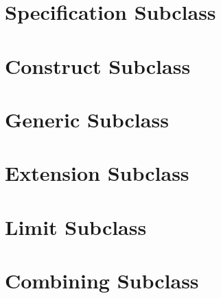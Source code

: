 \section{Specification Subclass}



\section{Construct Subclass}



\section{Generic Subclass}



\section{Extension Subclass}



\section{Limit Subclass}



\section{Combining Subclass}





\begin{lstlisting}[language=C++]

\end{lstlisting}





\begin{lstlisting}[language=C++]

\end{lstlisting}





\begin{lstlisting}[language=C++]

\end{lstlisting}




\begin{lstlisting}[language=C++]

\end{lstlisting}





